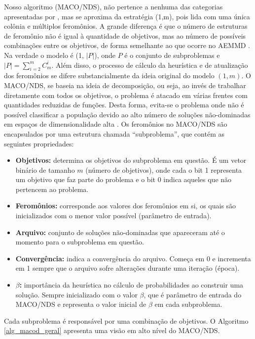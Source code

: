 Nosso algoritmo (MACO/NDS), não pertence a nenhuma das categorias apresentadas por \cite{Alaya2007}, mas se aproxima da estratégia (1,m), pois lida com uma única colônia e múltiplos feromônios. A grande diferença é que o número de estruturas de feromônio não é igual à quantidade de objetivos, mas ao número de possíveis combinações entre os objetivos, de forma semelhante ao que ocorre no AEMMD \cite{Lafeta2017}. Na verdade o modelo é (1, $|P|$), onde $P$ é o conjunto de subproblemas e $|P| = \sum_{i = 2}^m C_m^i$. Além disso, o processo de cálculo da heurística e de atualização dos feromônios se difere substancialmente da ideia original do modelo $(1,m)$. O MACO/NDS, se baseia na ideia de decomposição, ou seja, ao invés de trabalhar diretamente com todos os objetivos, o problema é atacado em várias frentes com quantidades reduzidas de funções. Desta forma, evita-se o problema onde não é possível classificar a população devido ao alto número de soluções não-dominadas em espaços de dimensionalidade alta \cite{Deb2014}. Os feromônios no MACO/NDS são encapsulados por uma estrutura chamada ``subproblema'', que contém as seguintes propriedades: 

\begin{itemize}
	\item \textbf{Objetivos:} determina os objetivos do subproblema em questão. É um vetor binário de tamanho $m$ (número de objetivos), onde cada o bit 1 representa um objetivo que faz parte do problema e o bit 0 indica aqueles que não pertencem ao problema.
	\item \textbf{Feromônios:} corresponde aos valores dos feromônios em si, os quais são inicializados com o menor valor possível (parâmetro de entrada).
	\item \textbf{Arquivo:} conjunto de soluções não-dominadas que apareceram até o momento para o subproblema em questão.
	\item \textbf{Convergência:} indica a convergência do arquivo. Começa em 0 e incrementa em 1 sempre que o arquivo sofre alterações durante uma iteração (época).
	\item \textbf{$\beta$:} importância da heurística no cálculo de probabilidades ao construir uma solução. Sempre inicializado com o valor $\beta$, que é parâmetro de entrada do MACO/NDS e representa o valor inicial de $\beta$ em cada subproblema.
\end{itemize}

Cada subproblema é responsável por uma combinação de objetivos. O Algoritmo \ref{alg_macod_geral} apresenta uma visão em alto nível do MACO/NDS.

